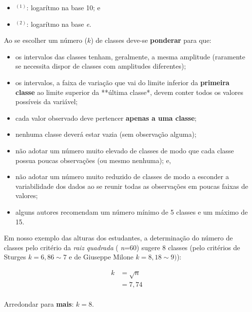 \documentclass[
]{book}
\providecommand{\tightlist}{%
  \setlength{\itemsep}{0pt}\setlength{\parskip}{0pt}}
\begin{document}
\begin{itemize}
\tightlist
\item
  \(^{(1)}\): logarítmo na base 10; e
\item
  \(^{(2)}\): logarítmo na base \emph{e}.
\end{itemize}

\hfill\break

Ao se escolher um número (\(k\)) de classes deve-se \textbf{ponderar} para que:

\hfill\break

\begin{itemize}
\tightlist
\item
  os intervalos das classes tenham, geralmente, a mesma amplitude (raramente se necessita dispor de classes com amplitudes diferentes);
\item
  os intervalos, a faixa de variação que vai do limite inferior da \textbf{primeira classe} ao limite superior da **última classe*, devem conter todos os valores possíveis da variável;
\item
  cada valor observado deve pertencer \textbf{apenas a uma classe};
\item
  nenhuma classe deverá estar vazia (sem observação alguma);\\
\item
  não adotar um número muito elevado de classes de modo que cada classe possua poucas observações (ou mesmo nenhuma); e,
\item
  não adotar um número muito reduzido de classes de modo a esconder a variabilidade dos dados ao se reunir todas as observações em poucas faixas de valores;
\item
  alguns autores recomendam um número mínimo de 5 classes e um máximo de 15.
\end{itemize}

\hfill\break

Em nosso exemplo das alturas dos estudantes, a determinação do número de classes pelo critério da \emph{raiz quadrada} ( \emph{n}=60) sugere 8 classes (pelo critérios de Sturges \(k=6,86 \sim 7\) e de Giuseppe Milone \(k=8,18 \sim 9)\)):

\hfill\break

\begin{align*}
k & =\sqrt{n} \\
 & = 7,74 \\
\end{align*}

\hfill\break

Arredondar para \textbf{mais}: \(k=8\).
\end{document}
